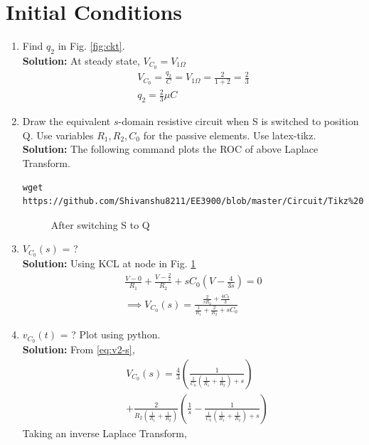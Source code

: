\documentclass[journal,12pt,twocolumn]{IEEEtran}
\newcommand{\solution}{\noindent \textbf{Solution: }}
\providecommand{\brak}[1]{\ensuremath{\left(#1\right)}}
\numberwithin{equation}{section}
\renewcommand\thesection{\arabic{section}}
\begin{document}
 \section{Initial Conditions}
\begin{enumerate}[label=\arabic*.,ref=\thesection.\theenumi]
\item Find $q_2$ in Fig. 
			\ref{fig:ckt}.\\
			\solution At steady state, $V_{C_0}=V_{1 \Omega}$
			\begin{align*}
			V_{C_0}=\frac{q_2}{C}=V_{1 \Omega}=\frac{2}{1+2}=\frac23\\
			q_2=\frac23 \mu C
			\end{align*}
\item Draw the equivalent $s$-domain resistive circuit when S is switched to position Q.  Use variables $R_1, R_2, C_0$ for the passive elements.
Use latex-tikz.\\
		\label{prob:init}
		\solution 
		The following command plots the ROC of above Laplace Transform.
	\begin{lstlisting}
wget https://github.com/Shivanshu8211/EE3900/blob/master/Circuit/Tikz%20Circuits/3.2.tex
\end{lstlisting}
	\begin{figure}[!ht]
 \centering

\caption{After switching S to Q}
\label{fig:sq}
\end{figure}
		\item $V_{C_0}(s)$ = ? \\
		\solution Using KCL at node in Fig. \ref{fig:sq}
\begin{align}
    \frac{V - 0}{R_1} + \frac{V - \frac{2}{s}}{R_2} + sC_0\brak{V - \frac{4}{3s}} = 0 \\
\implies V_{C_0}(s) = \frac{\frac{2}{sR_2} + \frac{4C_0}{3}}{\frac{1}{R_1} + \frac{2}{R_2} + sC_0}
\label{eq:v2-s}
\end{align} 
	\item $v_{C_0}(t)$ = ? Plot using python.\\
	\solution From \eqref{eq:v2-s},
\begin{align}
    &V_{C_0}(s) = \frac{4}{3}\brak{\frac{1}{\frac{1}{C_0}\brak{\frac{1}{R_1} + \frac{1}{R_2}}+s}} \nonumber \\
    &+ \frac{2}{R_2\brak{\frac{1}{R_1} +\frac{1}{R_2}}}\brak{\frac{1}{s} - \frac{1}{\frac{1}{C_0}\brak{\frac{1}{R_1} + \frac{1}{R_2}} + s}}
\end{align}
Taking an inverse Laplace Transform,
\begin{align}

\end{align}
\end{enumerate}
\end{document}
